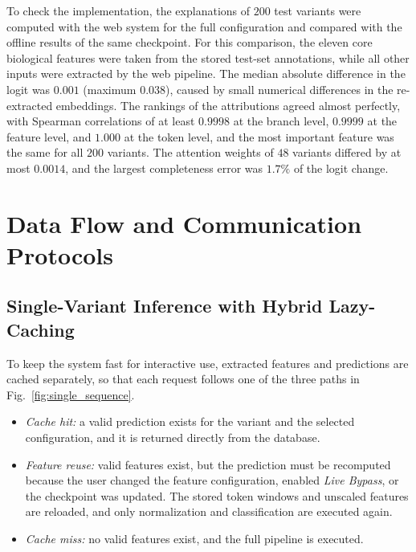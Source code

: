To check the implementation, the explanations of $200$ test variants were computed with the web system for the full configuration and compared with the offline results of the same checkpoint. For this comparison, the eleven core biological features were taken from the stored test-set annotations, while all other inputs were extracted by the web pipeline. The median absolute difference in the logit was $0.001$ (maximum $0.038$), caused by small numerical differences in the re-extracted embeddings. The rankings of the attributions agreed almost perfectly, with Spearman correlations of at least $0.9998$ at the branch level, $0.9999$ at the feature level, and $1.000$ at the token level, and the most important feature was the same for all $200$ variants. The attention weights of $48$ variants differed by at most $0.0014$, and the largest completeness error was $1.7\%$ of the logit change.

\section{Data Flow and Communication Protocols}
\label{sec:data_flow}

\subsection{Single-Variant Inference with Hybrid Lazy-Caching}

To keep the system fast for interactive use, extracted features and predictions are cached separately, so that each request follows one of the three paths in Fig.~\ref{fig:single_sequence}.

\begin{itemize}
    \item \textit{Cache hit:} a valid prediction exists for the variant and the selected configuration, and it is returned directly from the database.
    \item \textit{Feature reuse:} valid features exist, but the prediction must be recomputed because the user changed the feature configuration, enabled \textit{Live Bypass}, or the checkpoint was updated. The stored token windows and unscaled features are reloaded, and only normalization and classification are executed again.
    \item \textit{Cache miss:} no valid features exist, and the full pipeline is executed.
\end{itemize}

